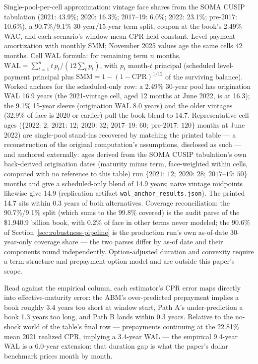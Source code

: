 \documentclass[12pt]{article}
\begin{document}
\begin{table}[t]
\begin{threeparttable}
\begin{tablenotes}[flushleft]
\item Single-pool-per-cell approximation: vintage face shares from the SOMA CUSIP tabulation (2021: 43.9\%; 2020: 16.3\%; 2017--19: 6.0\%; 2022: 23.1\%; pre-2017: 10.6\%), a 90.7\%/9.1\% 30-year/15-year term split, coupon at the book's 2.49\% WAC, and each scenario's window-mean CPR held constant. Level-payment amortization with monthly SMM; November 2025 values age the same cells 42 months. Cell WAL formula: for remaining term $n$ months, $\mathrm{WAL} = \sum_{t=1}^{n} t\, p_t / (12 \sum_{t} p_t)$, with $p_t$ month-$t$ principal (scheduled level-payment principal plus $\mathrm{SMM} = 1-(1-\mathrm{CPR})^{1/12}$ of the surviving balance). Worked anchors for the scheduled-only row: a 2.49\% 30-year pool has origination WAL 16.9 years (the 2021-vintage cell, aged 12 months at June 2022, is at 16.3); the 9.1\% 15-year sleeve (origination WAL 8.0 years) and the older vintages (32.9\% of face is 2020 or earlier) pull the book blend to 14.7. Representative cell ages ($\{2022{:}\,2;\ 2021{:}\,12;\ 2020{:}\,32;\ 2017\text{--}19{:}\,60;\ \text{pre-}2017{:}\,120\}$ months at June 2022) are single-pool stand-ins recovered by matching the printed table --- a reconstruction of the original computation's assumptions, disclosed as such --- and anchored externally: ages derived from the SOMA CUSIP tabulation's own back-derived origination dates (maturity minus term, face-weighted within cells, computed with no reference to this table) run $\{2021{:}\,12;\ 2020{:}\,28;\ 2017\text{--}19{:}\,50\}$ months and give a scheduled-only blend of 14.9 years; naive vintage midpoints likewise give 14.9 (replication artifact \texttt{wal\_anchor\_results.json}). The printed 14.7 sits within 0.3 years of both alternatives. Coverage reconciliation: the 90.7\%/9.1\% split (which sums to the 99.8\% covered) is the audit parse of the \$1{,}940.9 billion book, with 0.2\% of face in other terms never modeled; the 90.6\% of Section~\ref{sec:robustness-pipeline} is the production run's own as-of-date 30-year-only coverage share --- the two parses differ by as-of date and their components round independently. Option-adjusted duration and convexity require a term-structure and prepayment-option model and are outside this paper's scope.
\end{tablenotes}
\end{threeparttable}
\end{table}

Read against the empirical column, each estimator's CPR error maps directly into effective-maturity error: the ABM's over-predicted prepayment implies a book roughly 3.4 years too short at window start, Path A's under-prediction a book 1.3 years too long, and Path B lands within 0.3 years. Relative to the no-shock world of the table's final row --- prepayments continuing at the 22.81\% mean 2021 realized CPR, implying a 3.4-year WAL --- the empirical 9.4-year WAL is a 6.0-year extension: that duration gap is what the paper's dollar benchmark prices month by month.
\end{document}
